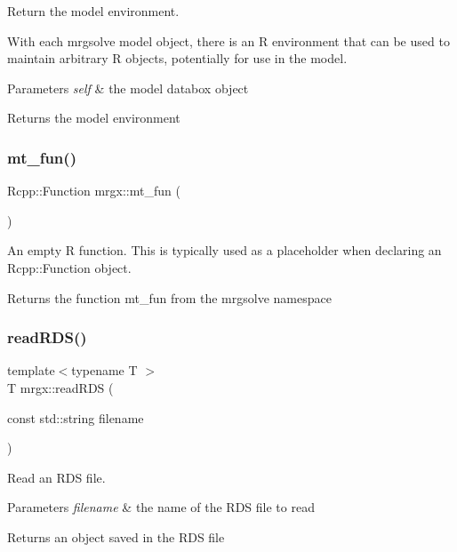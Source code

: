 Return the model environment. 

With each mrgsolve model object, there is an R environment that can be used to maintain arbitrary R objects, potentially for use in the model.


\begin{DoxyParams}{Parameters}
{\em self} & the model databox object \\
\hline
\end{DoxyParams}
\begin{DoxyReturn}{Returns}
the model environment 
\end{DoxyReturn}
\mbox{\label{group__mrgx_ga7f1beb36722634cc4ad7d28ccdedc80d}} 
\subsubsection{\texorpdfstring{mt\+\_\+fun()}{mt\_fun()}}
{\footnotesize\ttfamily Rcpp\+::\+Function mrgx\+::mt\+\_\+fun (\begin{DoxyParamCaption}{ }\end{DoxyParamCaption})}

An empty R function. This is typically used as a placeholder when declaring an {\ttfamily Rcpp\+::\+Function} object.

\begin{DoxyReturn}{Returns}
the function {\ttfamily mt\+\_\+fun} from the mrgsolve namespace 
\end{DoxyReturn}
\mbox{\label{group__mrgx_ga554f6cbf063e3b13452e510f5ca1cb95}} 
\subsubsection{\texorpdfstring{read\+R\+D\+S()}{readRDS()}}
{\footnotesize\ttfamily template$<$typename T $>$ \\
T mrgx\+::read\+R\+DS (\begin{DoxyParamCaption}\item[{const std\+::string}]{filename }\end{DoxyParamCaption})}

Read an R\+DS file.


\begin{DoxyParams}{Parameters}
{\em filename} & the name of the R\+DS file to read \\
\hline
\end{DoxyParams}
\begin{DoxyReturn}{Returns}
an object saved in the R\+DS file 
\end{DoxyReturn}
\mbox{\label{group__mrgx_ga4d965868d96d9afa2164f500c2c57ca4}} 
